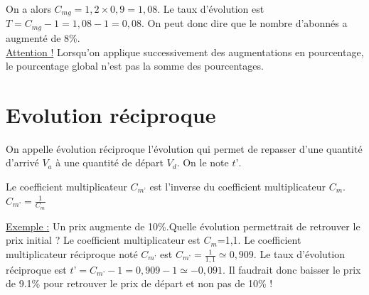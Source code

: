 \documentclass[french]{book}
\begin{document}
On a alors $C_{mg} = 1,2 \times 0,9 = 1,08$. Le taux d’évolution est $T = C_{mg}-1 = 1,08-1 = 0,08$. On peut donc dire que le nombre d’abonnés a augmenté de 8\%. \\

\underline{Attention !} Lorsqu’on applique successivement des augmentations en pourcentage, le pourcentage global n’est pas la somme des pourcentages.

   \section{Evolution réciproque}
\begin{defn}
On appelle évolution réciproque l’évolution qui permet de repasser d’une quantité d’arrivé $V_a$ à une quantité de départ $V_d$. On le note $t’$.
\end{defn}

\begin{prop}
Le coefficient multiplicateur $C_{m’}$ est l’inverse du coefficient multiplicateur $C_{m}$. $C_{m’}=\frac{1}{C_m}$
\end{prop}

\underline{Exemple :} Un prix augmente de 10\%.Quelle évolution permettrait de retrouver le prix initial ?
Le coefficient multiplicateur est $C_m$=1,1. Le coefficient multiplicateur réciproque noté $C_{m’}$ est $C_{m’}=\frac{1}{1,1}\simeq 0,909$.
Le taux d’évolution réciproque est $t’=C_{m’}-1=0,909-1 \simeq - 0,091$. Il faudrait donc baisser le prix de 9.1\% pour retrouver le prix de départ et non pas de 10\% !
\end{document}
